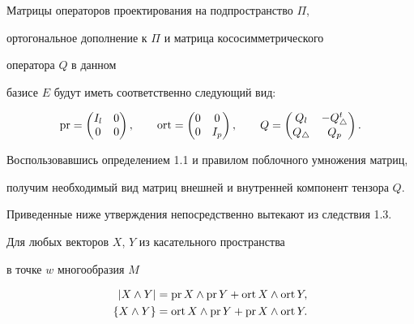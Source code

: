 \begin{pf} Матрицы операторов проектирования на подпространство $\Pi$,


ортогональное дополнение к $\Pi$ и матрица кососимметрического


оператора $Q$ в данном


базисе $E$ будут иметь соответственно следующий вид:


$$


\pr =


\begin{pmatrix}


I_l & 0\\


0 & 0


\end{pmatrix}


,\qquad


\ort =


\begin{pmatrix}


0 & 0\\


0 & I_p


\end{pmatrix}


,\qquad


Q=


\begin{pmatrix}


Q_l & -Q^t_\triangle\\


Q_\triangle & Q_p


\end{pmatrix}


.


$$


Воспользовавшись определением 1.1 и правилом поблочного умножения матриц,


получим необходимый вид матриц внешней и внутренней компонент тензора $Q$.


\end{pf}





Приведенные ниже утверждения непосредственно вытекают из следствия 1.3.





\begin{cors} Для любых векторов $X$, $Y$ из касательного пространства


в точке $w$ многообразия $M$


\begin{align}


|X\land Y|&= \pr X\land \pr Y+\ort X\land \ort Y,\\


\{ X\land Y\} &=\ort X\land \pr Y+\pr X\land \ort Y.


\end{align}


\end{cors}





